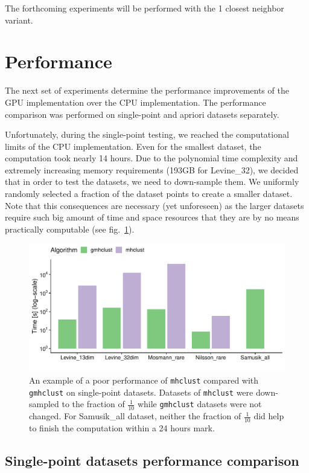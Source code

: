 The forthcoming experiments will be performed with the 1 closest neighbor variant.

\section{Performance}

The next set of experiments determine the performance improvements of the GPU implementation over the CPU implementation. The performance comparison was performed on single-point and apriori datasets separately.

Unfortunately, during the single-point testing, we reached the computational limits of the CPU implementation. Even for the smallest dataset, the computation took nearly 14 hours. Due to the polynomial time complexity and extremely increasing memory requirements (193GB for Levine\_32), we decided that in order to test the datasets, we need to down-sample them. We uniformly randomly selected a fraction of the dataset points to create a smaller dataset. Note that this consequences are necessary (yet unforeseen) as the larger datasets require such big amount of time and space resources that they are by no means practically computable (see fig.~\ref{fig04:fract_comp}).

\begin{figure}\centering
	\includegraphics[width=\linewidth]{img/mixed_perf_comp}
	\caption{An example of a poor performance of \texttt{mhclust} compared with \texttt{gmhclust} on single-point datasets. Datasets of \texttt{mhclust} were down-sampled to the fraction of $\frac{1}{10}$ while \texttt{gmhclust} datasets were not changed. For Samusik\_all dataset, neither the fraction of $\frac{1}{10}$ did help to finish the computation within a 24 hours mark.}
	\label{fig04:fract_comp}
\end{figure}

\subsection{Single-point datasets performance comparison}

